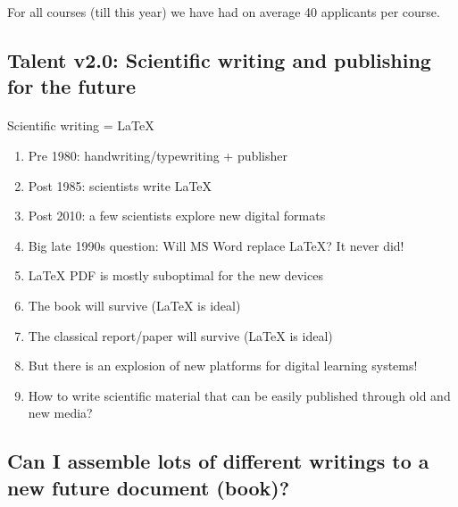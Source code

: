 \documentclass[%
twoside,                 %
final,                   %
10pt]{article}
\begin{document}
\noindent
For all courses (till this year) we have had on average 40 applicants per course.




\subsection{Talent v2.0: Scientific writing and publishing for the future}

\paragraph{}
Scientific writing = {\LaTeX}

\begin{enumerate}
\item Pre 1980: handwriting/typewriting + publisher

\item Post 1985: scientists write {\LaTeX}

\item Post 2010: a few scientists explore new digital formats

\item Big late 1990s question: Will MS Word replace {\LaTeX}? It never did!

\item {\LaTeX} PDF is mostly suboptimal for the new devices

\item The book will survive ({\LaTeX} is ideal)

\item The classical report/paper will survive ({\LaTeX} is ideal)

\item But there is an explosion of new platforms for digital learning systems!

\item How to write scientific material that can be easily published through old and new media?
\end{enumerate}

\noindent




\subsection{Can I assemble lots of different writings to a new future document (book)?}
\end{document}
